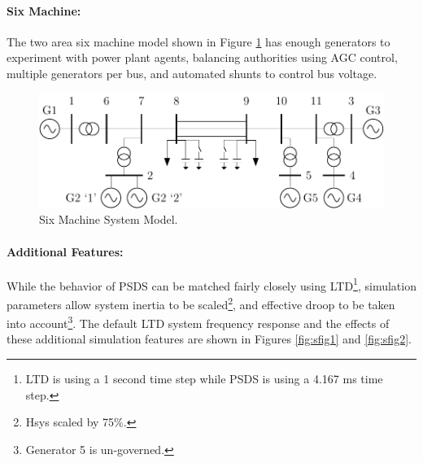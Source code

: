 \documentclass[12pt]{article}
\begin{document}
\pagebreak
\paragraph{Six Machine:} The two area six machine model shown in Figure \ref{system} has enough generators to experiment with power plant agents, balancing authorities using AGC control, multiple generators per bus, and automated shunts to control bus voltage.

\newcommand{\figW}{1}
\begin{figure}[h!]
	\centering
	\includegraphics[width=\figW\linewidth]{../../models/sixMachine/sixMachine}\vspace{-.5em}
	\caption{Six Machine System Model.}
	\label{system}		 
\end{figure}%

\paragraph{Additional Features:} While the behavior of PSDS can be matched fairly closely using LTD\footnote{LTD is using a 1 second time step while PSDS is using a 4.167 ms time step.}, simulation parameters allow system inertia to be scaled\footnote{Hsys scaled by 75\%.}, and effective droop to be taken into account\footnote{Generator 5 is un-governed.}. The default LTD system frequency response and the effects of these additional simulation features are shown in Figures \ref{fig:sfig1} and \ref{fig:sfig2}. 
\end{document}
